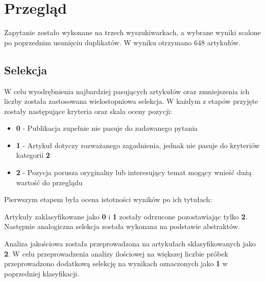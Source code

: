 \section{Przegląd}
Zapytanie zostało wykonane na trzech wyszukiwarkach, a wybrane wyniki scalone po poprzednim usunięciu duplikatów. W wyniku otrzymano 648 artykułów.

\subsection{Selekcja}
W celu wyodrębnienia najbardziej pasujących artykułów oraz zmniejszenia ich liczby została zastosowana wielostopniowa selekcja. W każdym z etapów przyjęte zostały następujące kryteria oraz skala oceny pozycji:
\begin{itemize}
    \item {\bf 0} - Publikacja zupełnie nie pasuje do zadawanego pytania
    \item {\bf 1} - Artykuł dotyczy rozważanego zagadnienia, jednak nie pasuje do kryteriów kategorii {\bf 2}
    \item {\bf 2} - Pozycja porusza oryginalny lub interesujący temat mogący wnieść dużą wartość do przeglądu
\end{itemize}
Pierwszym etapem była ocena istotności wyników po ich tytułach:

Artykuły zaklasyfikowane jako {\bf0} i {\bf1} zostały odrzucone pozostawiając tylko {\bf2}. Następnie analogiczna selekcja została wykonana na podstawie abstraktów.

Analiza jakościowa została przeprowadzona na artykułach sklasyfikowanych jako \textbf{2}. W celu przeprowadzenia analizy ilościowej na większej liczbie próbek przeprowadzono dodatkową selekcję na wynikach oznaczonych jako \textbf{1} w poprzedniej klasyfikacji.

